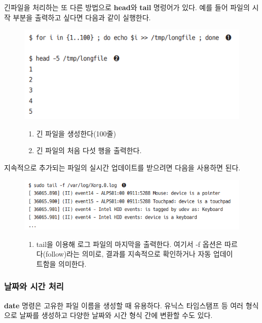 \begin{flushleft}
    긴파일을 처리하는 또 다른 방법으로 \textbf{head}와 \textbf{tail} 명렁어가 있다.
    예를 들어 파일의 시작 부분을 출력하고 싶다면 다음과 같이 실행한다.
\end{flushleft}

\begin{figure}[H]
    \includegraphics[width=15cm]{resource/3-head-example}
    \label{fig:head-example}
    \begin{enumerate}
        \item 긴 파일을 생성한다(100줄)
        \item 긴 파일의 처음 다섯 행을 출력한다.
    \end{enumerate}
\end{figure}

\begin{flushleft}
    지속적으로 추가되는 파일의 실시간 업데이트를 받으려면 다음을 사용하면 된다.
\end{flushleft}

\begin{figure}[H]
    \includegraphics[width=15cm]{resource/3-tail-example}
    \label{fig:tail-exemple}
    \begin{enumerate}
        \item tail을 이용해 로그 파일의 마지막을 출력한다.
            여기서 -f 옵션은 따르다(follow)라는 의미로,
            결과를 지속적으로 확인하거나 자동 업데이트함을 의미한다.
    \end{enumerate}
\end{figure}


\subsubsection*{날짜와 시간 처리}
\begin{flushleft}
    \textbf{date} 명령은 고유한 파일 이름을 생성할 때 유용하다.
    유닉스 타임스탬프 등 여러 형식으로 날짜를 생성하고
    다양한 날짜와 시간 형식 간에 변환할 수도 있다.
\end{flushleft}

